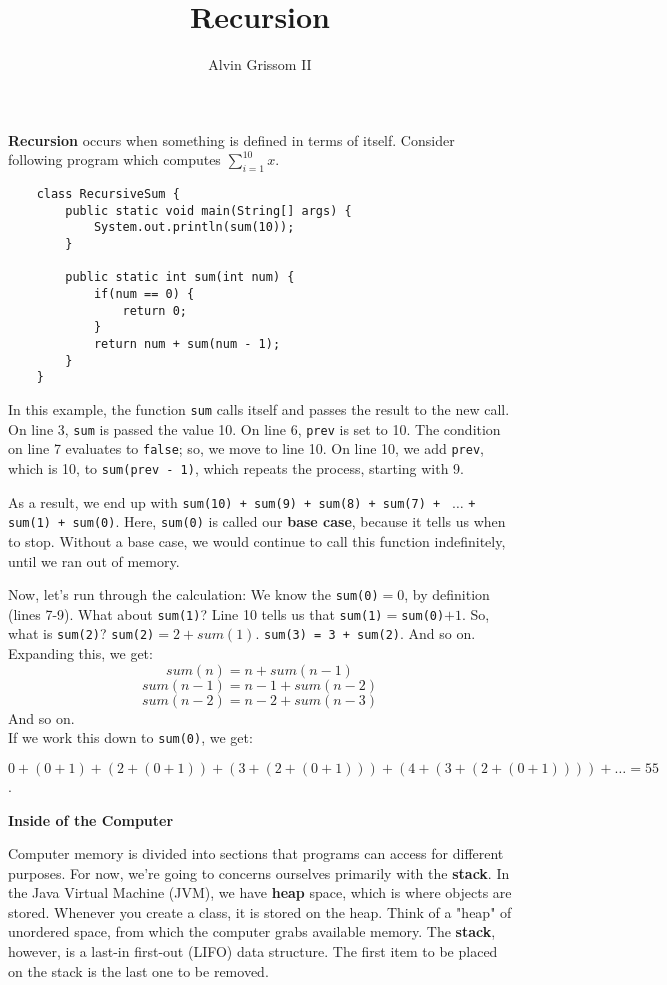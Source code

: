 \documentclass[12pt]{article}
\title{Recursion}
\author{Alvin Grissom II}
\begin{document}
\maketitle

\textbf{Recursion} occurs when something is defined in terms of
itself. Consider following program which computes $\sum_{i=1}^{10} x$.
\begin{verbatim}
    class RecursiveSum {
        public static void main(String[] args) {
            System.out.println(sum(10));
        }
        
        public static int sum(int num) {
            if(num == 0) {
	            return 0;
            }
            return num + sum(num - 1);
        }
    }
\end{verbatim}
In this example, the function \texttt{sum} calls itself and passes the
result to the new call.  On line 3, \texttt{sum} is passed the value
10.  On line 6, \texttt{prev} is set to 10.  The condition on line 7
evaluates to \texttt{false}; so, we move to line 10.  On line 10, we
add \texttt{prev}, which is 10, to \texttt{sum(prev - 1)}, which
repeats the process, starting with 9.

As a result, we end up with \texttt{sum(10) + sum(9) + sum(8) + sum(7)
  + } $\dots$ \texttt{+ sum(1) + sum(0)}.  Here, \texttt{sum(0)} is
called our \textbf{base case}, because it tells us when to stop.
Without a base case, we would continue to call this function
indefinitely, until we ran out of memory.

Now, let's run through the calculation: We know the
\texttt{sum(0)}$=0$, by definition (lines 7-9).  What about
\texttt{sum(1)}?  Line 10 tells us that
\texttt{sum(1)}$=$\texttt{sum(0)}$+1$. So, what is \texttt{sum(2)}?
\texttt{sum(2)}$=2 + sum(1).$ \texttt{sum(3) = 3 + sum(2)}.  And so
on.  Expanding this, we get:
$$sum(n) = n + sum(n-1)$$ 
$$sum(n-1) = n - 1 + sum(n-2)$$ 
$$sum(n-2) = n - 2 + sum(n-3)$$ 
And so on. \\

If we work this down to \texttt{sum(0)}, we get:

$0+(0 + 1) + (2 + (0 + 1)) + (3 + (2 + (0 + 1))) + (4 +(3 + (2 + (0 + 1)))) +\dots = 55$.

\textbf{Inside of the Computer}

Computer memory is divided into sections that programs can access for
different purposes.  For now, we're going to concerns ourselves
primarily with the \textbf{stack}.  In the Java Virtual Machine (JVM),
we have \textbf{heap} space, which is where objects are stored.
Whenever you create a class, it is stored on the heap.  Think of a
"heap" of unordered space, from which the computer grabs available
memory.  The \textbf{stack}, however, is a last-in first-out (LIFO)
data structure.  The first item to be placed on the stack is the last
one to be removed.
\end{document}
